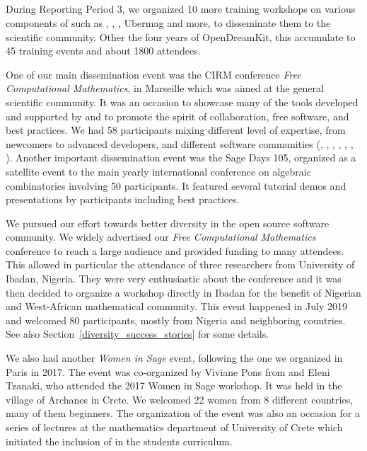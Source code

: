 \subparagraph{}
\label{dissem@dissemination}

During Reporting Period 3, we organized 10 more training workshops on
various components of \ODK such as \Sage, \Jupyter, \GAP, Ubermag and
more, to disseminate them to the scientific community. Other the four
years of OpenDreamKit, this accumulate to 45 training events and about
1800 attendees.


One of our main dissemination event was the CIRM conference \emph{Free Computational Mathematics}, in Marseille which was aimed at the general scientific community.  It was an occasion to showcase  many of the tools developed and supported by \ODK and to promote the spirit of collaboration, free software, and best practices. We had 58 participants mixing different level of expertise, from newcomers to advanced developers, and different software communities (\GAP, \Jupyter, \Linbox,  \MPIR, \PariGP, \Sage, \Singular). Another important dissemination event was the Sage Days 105, organized as a satellite event to the main yearly international conference  on algebraic combinatorics involving 50 participants. It featured several tutorial demos and presentations by \ODK participants including best practices.

We pursued our effort towards better diversity in the open source software community. We widely advertised our
  \emph{Free Computational Mathematics} conference to reach a large audience and provided funding to many attendees.
  This allowed in particular the attendance of three researchers from University of Ibadan, Nigeria. They were very enthusiastic
  about the conference and it was then decided to organize a \Sage workshop directly in Ibadan for the benefit of Nigerian and
  West-African mathematical community. This event happened in July 2019 and welcomed 80 participants, mostly from Nigeria and
  neighboring countries.
  See also Section~\ref{diversity_success_stories} for some details.

  We also had another \emph{Women in Sage} event, following the one we organized in Paris in 2017. The event was co-organized
  by Viviane Pons from \ODK and Eleni Tzanaki, who attended the 2017 Women in Sage workshop. It was held in the village of Archanes
  in Crete. We welcomed 22 women from 8 different countries, many of them \Sage beginners. The organization of the event was also
  an occasion for a series of \Sage lectures at the mathematics department of University of Crete which initiated the inclusion of \Sage
  in the students curriculum.


